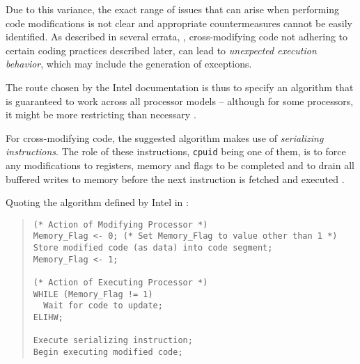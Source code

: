 Due to this variance, the exact range of issues that can arise when performing code modifications
is not clear and appropriate countermeasures cannot be easily identified. As described in several
errata, \cite{intel02_Err}, cross-modifying code not adhering to certain coding practices described later, can
lead to \emph{unexpected execution behavior}, which may include the generation of exceptions. 

The route chosen by the Intel documentation is thus to specify an algorithm that is guaranteed
to work across all processor models -- although for some processors, it might be more restricting than
necessary \cite{intel07_3A}. 

For cross-modifying code, the suggested algorithm makes use of \emph{serializing instructions}.
The role of these instructions, \verb|cpuid| being one of them, is to force any modifications
to registers, memory and flags to be completed and to drain all buffered writes to memory 
before the next instruction is fetched and executed \cite{intel07_3A}. 

Quoting the algorithm defined by Intel in \cite{intel07_3A}:
\begin{quote}
\begin{verbatim}
(* Action of Modifying Processor *)
Memory_Flag <- 0; (* Set Memory_Flag to value other than 1 *)	
Store modified code (as data) into code segment;	
Memory_Flag <- 1;	

(* Action of Executing Processor *)	
WHILE (Memory_Flag != 1)	
  Wait for code to update;	
ELIHW;
	
Execute serializing instruction;	
Begin executing modified code;	
\end{verbatim}
\end{quote}



